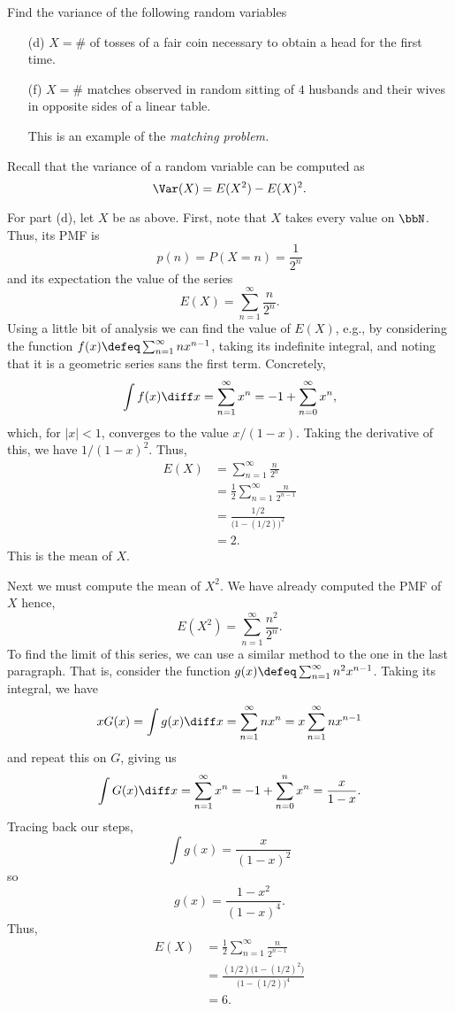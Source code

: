 \begin{problem}[Handout 7, \# 6(d, f)]
  Find the variance of the following random variables
  \begin{itemize}[noitemsep]
  \item[(d)] \(X=\#\) of tosses of a fair coin necessary to obtain a head
    for the first time.
  \item[(f)] \(X=\#\) matches observed in random sitting of \(4\) husbands
    and their wives in opposite sides of a linear table.

    This is an example of the \emph{matching problem.}
  \end{itemize}
\end{problem}
\begin{solution}
  Recall that the variance of a random variable can be computed as
  \[
    \Var(X)=E(X^2)-E(X)^2.
  \]

  For part (d), let \(X\) be as above. First, note that \(X\) takes every
  value on \(\bbN\). Thus, its PMF is
  \[
    p(n)=P(X=n)=\frac{1}{2^n}
  \]
  and its expectation the value of the series
  \[
    E(X)=\sum_{n=1}^\infty \frac{n}{2^n}.
  \]
  Using a little bit of analysis we can find the value of \(E(X)\), e.g.,
  by considering the function \(f(x)\defeq\sum_{n=1}^\infty nx^{n-1}\), taking its
  indefinite integral, and noting that it is a geometric series sans the
  first term. Concretely,
  \[
    \int f(x)\diff x=\sum_{n=1}^\infty x^n=-1+\sum_{n=0}^\infty x^n,
  \]
  which, for \(|x|<1\), converges to the value \(x/(1-x)\). Taking the
  derivative of this, we have \(1/(1-x)^2\). Thus,
  \begin{align*}
    E(X)&=\sum_{n=1}^\infty \frac{n}{2^n}\\
        &=\frac{1}{2}\sum_{n=1}^\infty\frac{n}{2^{n-1}}\\
        &=\frac{1/2}{\bigl(1-(1/2)\bigr)^2}\\
        &=2.
  \end{align*}
  This is the mean of \(X\).

  Next we must compute the mean of \(X^2\). We have already computed the
  PMF of \(X\) hence,
  \[
    E(X^2)=\sum_{n=1}^\infty\frac{n^2}{2^n}.
  \]
  To find the limit of this series, we can use a similar method to the one
  in the last paragraph. That is, consider the function \(g(x)\defeq
  \sum_{n=1}^\infty n^2x^{n-1}\). Taking its integral, we have
  \[
    xG(x)=\int g(x)\diff x=\sum_{n=1}^\infty nx^n=x\sum_{n=1}^\infty nx^{n-1}
  \]
  and repeat this on \(G\), giving us
  \[
    \int G(x)\diff x=\sum_{n=1}^\infty x^n=-1+\sum_{n=0}^n x^n=\frac{x}{1-x}.
  \]
  Tracing back our steps,
  \[
    \int g(x)=\frac{x}{(1-x)^2}
  \]
  so
  \[
    g(x)=\frac{1-x^2}{(1-x)^4}.
  \]
  Thus,
  \begin{align*}
    E(X)
    &=\frac{1}{2}\sum_{n=1}^\infty\frac{n}{2^{n-1}}\\
    &=\frac{(1/2)\bigl(1-(1/2)^2\bigr)}{\bigl(1-(1/2)\bigr)^4}\\
    &=6.
  \end{align*}


\end{solution}
